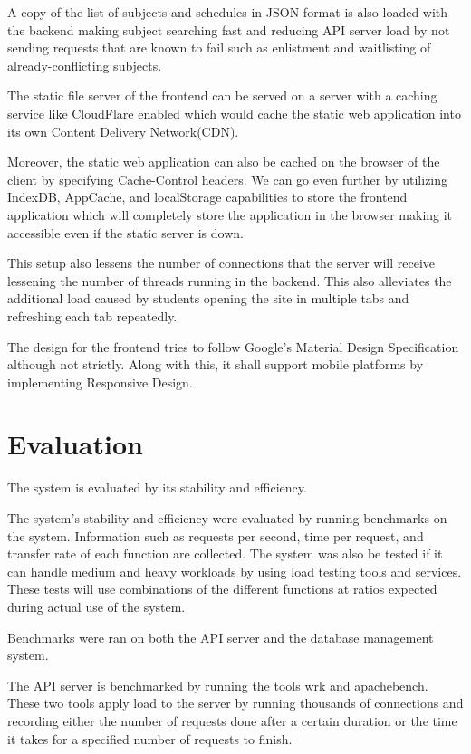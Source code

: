 \documentclass{sigchi}
\begin{document}
A copy of the list of subjects and schedules in JSON format is also loaded with the backend
making subject searching fast and reducing API server load by not sending requests that are known 
to fail such as enlistment and waitlisting of already-conflicting subjects.

The static file server of the frontend can be served on a server with a caching service
like CloudFlare enabled which would cache the static web application into its own 
Content Delivery Network(CDN).

Moreover, the static web application can also be cached on the browser of the client by
specifying Cache-Control headers. We can go even further by utilizing IndexDB, AppCache,
and localStorage capabilities to store the frontend application which will completely store
the application in the browser making it accessible even if the static server is down.

This setup also lessens the number of connections that the server will receive lessening
the number of threads running in the backend. This also alleviates the additional load 
caused by students opening the site in multiple tabs and refreshing each tab repeatedly.

The design for the frontend tries to follow Google's Material Design 
Specification although not strictly. Along with this, it shall support mobile
platforms by implementing Responsive Design. 

\section{Evaluation}

The system is evaluated by its stability and efficiency.

The system's stability and efficiency were evaluated by running benchmarks on the system.
Information such as requests per second, time per request, and transfer rate
of each function are collected. The system was also be tested if it can 
handle medium and heavy workloads by using load testing tools and services.
These tests will use combinations of the different functions at ratios expected
during actual use of the system. 

Benchmarks were ran on both the API server and the database management system.

The API server is benchmarked by running the tools wrk and apachebench. These two tools apply 
load to the server by running thousands of connections and recording either the number
of requests done after a certain duration or the time it takes for a specified number of requests to finish.
\end{document}
